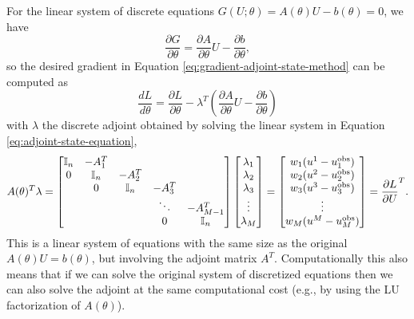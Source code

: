 For the linear system of discrete equations $G(U; \theta)=A(\theta) U - b(\theta)=0$, we have 
\begin{equation}
    \frac{\partial G}{\partial \theta} 
    = 
    \frac{\partial A }{\partial \theta} U - \frac{\partial b}{\partial \theta},
\end{equation}
so the desired gradient in Equation \eqref{eq:gradient-adjoint-state-method} can be computed as 
\begin{equation}
    \frac{dL}{d\theta} 
    = 
    \frac{\partial L}{\partial \theta} 
    - 
    \lambda^T \left( \frac{\partial A }{\partial \theta} U - \frac{\partial b}{\partial \theta} \right)
    \label{eq:dhdtheta_linear}
\end{equation}
with $\lambda$ the discrete adjoint obtained by solving the linear system in Equation \eqref{eq:adjoint-state-equation},
\begin{equation}
    A(\theta)^T \lambda 
    =
    \begin{bmatrix}
        \operatorname{\mathbb{I}}_{n} & -A_1^T &   &  & \\
        0 & \operatorname{\mathbb{I}}_{n} & -A_2^T &  &  \\
          & 0 & \operatorname{\mathbb{I}}_{n} & -A_3^T &  \\
         &  &   & \ddots & -A_{M-1}^T  \\
         &  &  & 0 & \operatorname{\mathbb{I}}_{n}
    \end{bmatrix}
    \begin{bmatrix}
        \lambda_1 \\
        \lambda_2 \\
        \lambda_3 \\
        \vdots \\
        \lambda_M
    \end{bmatrix}
    = 
    \begin{bmatrix}
        w_1 (u^1 - u_1^\text{obs}) \\
        w_2 (u^2 - u_2^\text{obs}) \\
        w_3 (u^3 - u_3^\text{obs}) \\
        \vdots \\
        w_M (u^M - u_M^\text{obs})     
    \end{bmatrix}
    = 
    \frac{\partial L}{\partial U}^T.
    \label{eq:linea-adjoint-state-equation}
\end{equation}
This is a linear system of equations with the same size as the original $A(\theta) U = b(\theta)$, but involving the adjoint matrix $A^T$. 
Computationally this also means that if we can solve the original system of discretized equations then we can also solve the adjoint at the same computational cost (e.g., by using the LU factorization of $A(\theta)$). 
